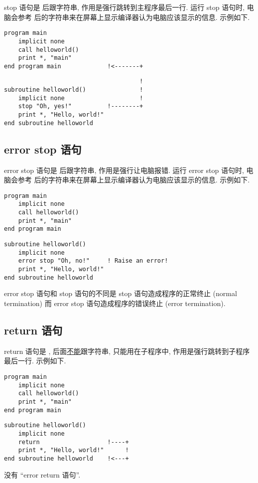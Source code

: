 stop 语句是  后跟字符串, 作用是强行跳转到主程序最后一行. 运行 stop 语句时, 电脑会参考  后的字符串来在屏幕上显示编译器认为电脑应该显示的信息. 示例如下.
\begin{lstlisting}
program main
    implicit none
    call helloworld()
    print *, "main"
end program main             !<-------+
\end{lstlisting}
\begin{lstlisting}                                      !
subroutine helloworld()               !
    implicit none                     !
    stop "Oh, yes!"          !--------+
    print *, "Hello, world!"
end subroutine helloworld
\end{lstlisting}

\subsection{error stop 语句}

error stop 语句是  后跟字符串, 作用是强行让电脑报错. 运行 error stop 语句时, 电脑会参考  后的字符串来在屏幕上显示编译器认为电脑应该显示的信息. 示例如下.
\begin{lstlisting}
program main
    implicit none
    call helloworld()
    print *, "main"
end program main
\end{lstlisting}
\begin{lstlisting}
subroutine helloworld()
    implicit none
    error stop "Oh, no!"     ! Raise an error!
    print *, "Hello, world!"
end subroutine helloworld
\end{lstlisting}
error stop 语句和 stop 语句的不同是 stop 语句造成程序的正常终止 (normal termination) 而 error stop 语句造成程序的错误终止 (error termination).

\subsection{return 语句}

return 语句是 , 后面\uline{不能}跟字符串, 只能用在子程序中, 作用是强行跳转到子程序最后一行. 示例如下.
\begin{lstlisting}
program main
    implicit none
    call helloworld()
    print *, "main"
end program main
\end{lstlisting}
\begin{lstlisting}
subroutine helloworld()
    implicit none
    return                   !----+
    print *, "Hello, world!"      !
end subroutine helloworld    !<---+
\end{lstlisting}
没有 ``error return 语句''.
